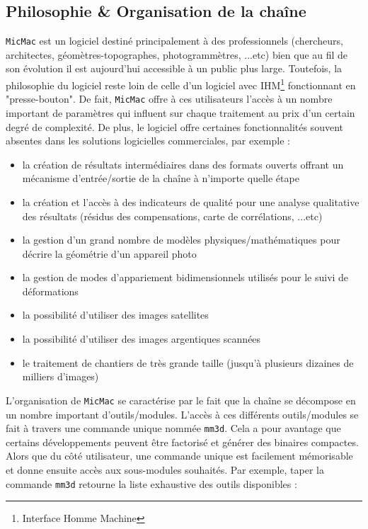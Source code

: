 \documentclass[a4paper,10pt]{article} %
\begin{document}
\subsection{Philosophie \& Organisation de la chaîne}\label{subsec_organisation}
{\tt MicMac} est un logiciel destiné principalement à des professionnels (chercheurs, architectes, géomètres-topographes, photogrammètres, ...etc) bien que au fil de son évolution il est aujourd'hui accessible à un public plus large. Toutefois, la philosophie du logiciel reste loin de celle d'un logiciel avec IHM\footnote{Interface Homme Machine} fonctionnant en "presse-bouton". De fait, {\tt MicMac} offre à ces utilisateurs l'accès à un nombre important de paramètres qui influent sur chaque traitement au prix d'un certain degré de complexité. De plus, le logiciel offre certaines fonctionnalités souvent absentes dans les solutions logicielles commerciales, par exemple :

\begin{itemize}
\item la création de résultats intermédiaires dans des formats ouverts offrant un mécanisme d'entrée/sortie de la chaîne à n'importe quelle étape
\item la création et l'accès à des indicateurs de qualité pour une analyse qualitative des résultats (résidus des compensations, carte de corrélations, ...etc)
\item la gestion d'un grand nombre de modèles physiques/mathématiques pour décrire la géométrie d'un appareil photo
\item la gestion de modes d'appariement bidimensionnels utilisés pour le suivi de déformations
\item la possibilité d'utiliser des images satellites
\item la possibilité d'utiliser des images argentiques scannées
\item le traitement de chantiers de très grande taille (jusqu'à plusieurs dizaines de milliers d'images)
\end{itemize}

L'organisation de {\tt MicMac} se caractérise par le fait que la chaîne se décompose en un nombre important d'outils/modules. L'accès à ces différents outils/modules se fait à travers une commande unique nommée {\tt mm3d}. Cela a pour avantage que certains développements peuvent être factorisé et générer des binaires compactes. Alors que du côté utilisateur, une commande unique est facilement mémorisable et donne ensuite accès aux sous-modules souhaités. Par exemple, taper la commande {\tt mm3d} retourne la liste exhaustive des outils disponibles :
\end{document}
